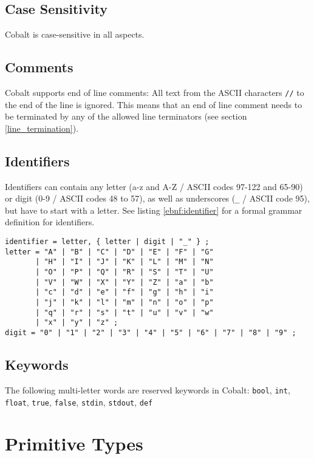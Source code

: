\documentclass[a4paper,appendixprefix]{scrreprt}
\begin{document}
\section{Case Sensitivity}
Cobalt is case-sensitive in all aspects.

\section{Comments}
Cobalt supports end of line comments: All text from the ASCII characters \verb!//! to the end of the line is ignored. This means that an end of line comment needs to be terminated by any of the allowed line terminators (see section \ref{line_termination}).

\section{Identifiers}
Identifiers can contain any letter (a-z and A-Z / ASCII codes 97-122 and 65-90) or digit (0-9 / ASCII codes 48 to 57), as well as underscores (\verb!_! / ASCII code 95), but have to start with a letter. See listing \ref{ebnf:identifier} for a formal grammar definition for identifiers.

\begin{minipage}{\linewidth}
\begin{lstlisting}[label={ebnf:identifier},caption={Identifier Grammar}]
identifier = letter, { letter | digit | "_" } ;
letter = "A" | "B" | "C" | "D" | "E" | "F" | "G"
       | "H" | "I" | "J" | "K" | "L" | "M" | "N"
       | "O" | "P" | "Q" | "R" | "S" | "T" | "U"
       | "V" | "W" | "X" | "Y" | "Z" | "a" | "b"
       | "c" | "d" | "e" | "f" | "g" | "h" | "i"
       | "j" | "k" | "l" | "m" | "n" | "o" | "p"
       | "q" | "r" | "s" | "t" | "u" | "v" | "w"
       | "x" | "y" | "z" ;
digit = "0" | "1" | "2" | "3" | "4" | "5" | "6" | "7" | "8" | "9" ;
\end{lstlisting}
\end{minipage}

\section{Keywords}
The following multi-letter words are reserved keywords in Cobalt: \verb!bool!, \verb!int!, \verb!float!, \verb!true!, \verb!false!, \verb!stdin!, \verb!stdout!, \verb!def!

\chapter{Primitive Types}
\end{document}

